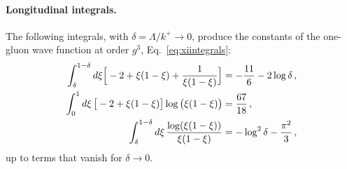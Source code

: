 \paragraph{Longitudinal integrals.} The following integrals, with $\delta=\Lambda/k^+\to0$, produce the constants of the one-gluon wave function at order $g^3$, Eq.~\eqref{eq:xiintegrals}:
\begin{align}
\int_\delta^{1-\delta}d\xi\Big[-2+\xi(1-\xi)+\frac{1}{\xi(1-\xi)}\Big]&=-\frac{11}{6}-2\log\delta\,,\notag\\
\int_0^1d\xi\,\big[-2+\xi(1-\xi)\big]\log\big(\xi(1-\xi)\big)&=\frac{67}{18}\,,\notag\\
\int_\delta^{1-\delta}d\xi\,\frac{\log(\xi(1-\xi))}{\xi(1-\xi)}&=-\log^2\delta-\frac{\pi^2}{3}\,,
\end{align}
up to terms that vanish for $\delta\to0$.
